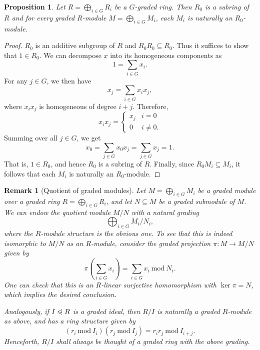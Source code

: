 \documentclass[11pt]{article}
\theoremstyle{thmstyle}
\newtheorem{proposition}[theorem]{Proposition}
\theoremstyle{defstyle}
\newtheorem{remark}[theorem]{Remark}
\renewcommand{\mod}{~\mathrm{mod}~}
\newcommand{\noreq}{\trianglelefteqslant}
\begin{document}
\begin{proposition}
    Let $\displaystyle R = \bigoplus_{i\in G} R_i$ be a $G$-graded ring. Then $R_0$ is a subring of $R$ and for every graded $R$-module $\displaystyle M = \bigoplus_{i\in G} M_i$, each $M_i$ is naturally an $R_0$-module.
\end{proposition}
\begin{proof}
    $R_0$ is an additive subgroup of $R$ and $R_0 R_0\subseteq R_0$. Thus it suffices to show that $1\in R_0$. We can decompose $x$ into its homogeneous components as 
    \begin{equation*}
        1 = \sum_{i\in G} x_i.
    \end{equation*}
    For any $j\in G$, we then have 
    \begin{equation*}
        x_j = \sum_{i\in G} x_ix_j,
    \end{equation*}
    where $x_ix_j$ is homogeneous of degree $i + j$. Therefore, 
    \begin{equation*}
        x_ix_j = 
        \begin{cases}
            x_j & i = 0\\
            0 & i\ne 0.
        \end{cases}
    \end{equation*}
    Summing over all $j\in G$, we get 
    \begin{equation*}
        x_0 = \sum_{j\in G} x_0x_j = \sum_{j\in G} x_j = 1.
    \end{equation*}
    That is, $1\in R_0$, and hence $R_0$ is a subring of $R$. Finally, since $R_0 M_i\subseteq M_i$, it follows that each $M_i$ is naturally an $R_0$-module.
\end{proof}

\begin{remark}[Quotient of graded modules]
    Let $M = \bigoplus_{i\in G} M_i$ be a graded module over a graded ring $R = \bigoplus_{i\in G} R_i$, and let $N\subseteq M$ be a graded submodule of $M$. We can endow the quotient module $M/N$ with a natural grading 
    \begin{equation*}
        \bigoplus_{i\in G} M_i/N_i,
    \end{equation*}
    where the $R$-module structure is the obvious one. To see that this is indeed isomorphic to $M/N$ as an $R$-module, consider the graded projection $\pi\colon M\to M/N$ given by 
    \begin{equation*}
        \pi\left(\sum_{i\in G} x_i\right) = \sum_{i\in G} x_i\mod N_i.
    \end{equation*}
    One can check that this is an $R$-linear surjective homomorphism with $\ker\pi = N$, which implies the desired conclusion.

    Analogously, if $I\noreq R$ is a graded ideal, then $R/I$ is naturally a graded $R$-module as above, and has a ring structure given by 
    \begin{equation*}
        \left(r_i\mod I_i\right)\left(r_j\mod I_j\right) = r_ir_j \mod I_{i + j}.
    \end{equation*}
    Henceforth, $R/I$ shall always be thought of a graded ring with the above grading.
\end{remark}
\end{document}
